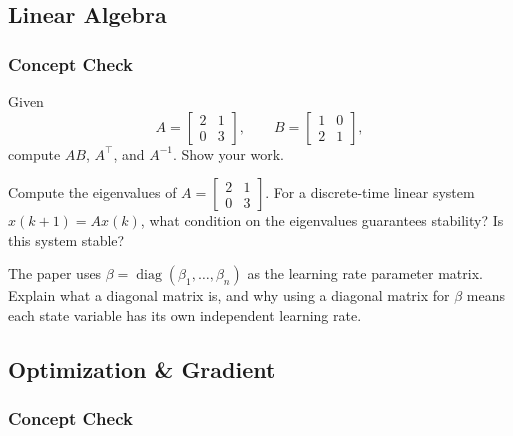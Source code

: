 \subsection{Linear Algebra}

\subsubsection*{Concept Check}

Given
\[
	A = \begin{bmatrix} 2 & 1 \\ 0 & 3 \end{bmatrix}, \qquad
	B = \begin{bmatrix} 1 & 0 \\ 2 & 1 \end{bmatrix},
\]
compute $AB$, $A^\top$, and $A^{-1}$. Show your work.

\begin{largeanswer}\end{largeanswer}

Compute the eigenvalues of $A = \begin{bmatrix} 2 & 1 \\ 0 & 3 \end{bmatrix}$. For a discrete-time linear system $x(k+1) = Ax(k)$, what condition on the eigenvalues guarantees stability? Is this system stable?

\begin{answerbox}\end{answerbox}

The paper uses $\beta = \operatorname{diag}(\beta_1, \dots, \beta_n)$ as the learning rate parameter matrix. Explain what a diagonal matrix is, and why using a diagonal matrix for $\beta$ means each state variable has its own independent learning rate.

\begin{answerbox}\end{answerbox}

\subsection{Optimization \& Gradient}

\subsubsection*{Concept Check}

